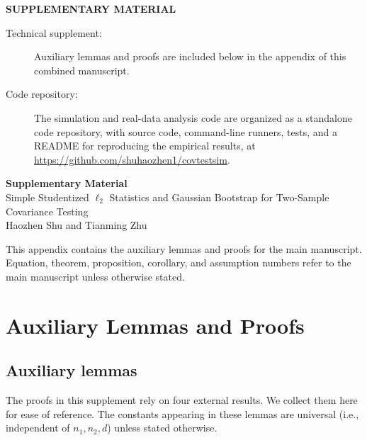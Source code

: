 \documentclass[
  12pt]{article}
\theoremstyle{plain}
\theoremstyle{definition}
\theoremstyle{remark}
\begin{document}
\begin{center}
{\large\bf SUPPLEMENTARY MATERIAL}
\end{center}

\begin{description}
\item[Technical supplement:]
Auxiliary lemmas and proofs are included below in the appendix of this
combined manuscript.
\item[Code repository:]
The simulation and real-data analysis code are organized as a standalone code
repository, with source code, command-line runners, tests, and a README for
reproducing the empirical results, at
\url{https://github.com/shuhaozhen1/covtestsim}.
\end{description}

\clearpage
\appendix
{}

\begin{center}
{\LARGE\bf Supplementary Material}\\[0.5em]
{\large Simple Studentized \texorpdfstring{$\ell_2$}{l2} Statistics and Gaussian Bootstrap for Two-Sample Covariance Testing}\\[0.5em]
Haozhen Shu and Tianming Zhu
\end{center}

\bigskip

This appendix contains the auxiliary lemmas and proofs for the main manuscript.
Equation, theorem, proposition, corollary, and assumption numbers refer to the
main manuscript unless otherwise stated.

\section{Auxiliary Lemmas and Proofs}

\subsection{Auxiliary lemmas}
\label{subsec:auxiliary_lemmas}

The proofs in this supplement rely on four external results. We collect them
here for ease of reference. The constants appearing in these lemmas are
universal (i.e., independent of \(n_1,n_2,d\)) unless stated otherwise.
\end{document}
